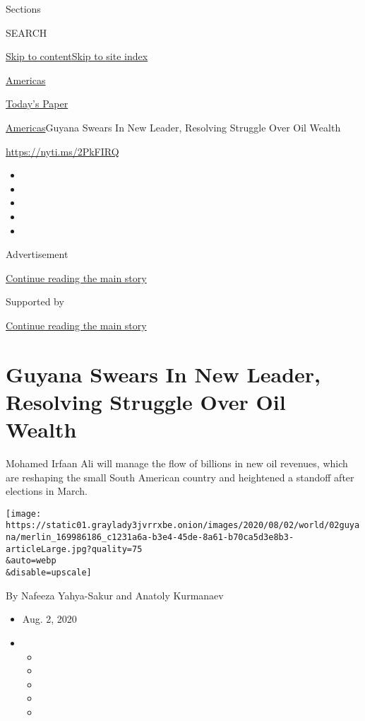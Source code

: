 Sections

SEARCH

\protect\hyperlink{site-content}{Skip to
content}\protect\hyperlink{site-index}{Skip to site index}

\href{https://www.nytimes3xbfgragh.onion/section/world/americas}{Americas}

\href{https://myaccount.nytimes3xbfgragh.onion/auth/login?response_type=cookie\&client_id=vi}{}

\href{https://www.nytimes3xbfgragh.onion/section/todayspaper}{Today's
Paper}

\href{/section/world/americas}{Americas}\textbar{}Guyana Swears In New
Leader, Resolving Struggle Over Oil Wealth

\url{https://nyti.ms/2PkFIRQ}

\begin{itemize}
\item
\item
\item
\item
\item
\end{itemize}

Advertisement

\protect\hyperlink{after-top}{Continue reading the main story}

Supported by

\protect\hyperlink{after-sponsor}{Continue reading the main story}

\hypertarget{guyana-swears-in-new-leader-resolving-struggle-over-oil-wealth}{%
\section{Guyana Swears In New Leader, Resolving Struggle Over Oil
Wealth}\label{guyana-swears-in-new-leader-resolving-struggle-over-oil-wealth}}

Mohamed Irfaan Ali will manage the flow of billions in new oil revenues,
which are reshaping the small South American country and heightened a
standoff after elections in March.

\texttt{[image: https://static01.graylady3jvrrxbe.onion/images/2020/08/02/world/02guyana/merlin\_169986186\_c1231a6a-b3e4-45de-8a61-b70ca5d3e8b3-articleLarge.jpg?quality=75\\\&auto=webp\\\&disable=upscale]}

By Nafeeza Yahya-Sakur and Anatoly Kurmanaev

\begin{itemize}
\item
  Aug. 2, 2020
\item
  \begin{itemize}
  \item
  \item
  \item
  \item
  \item
  \end{itemize}
\end{itemize}

